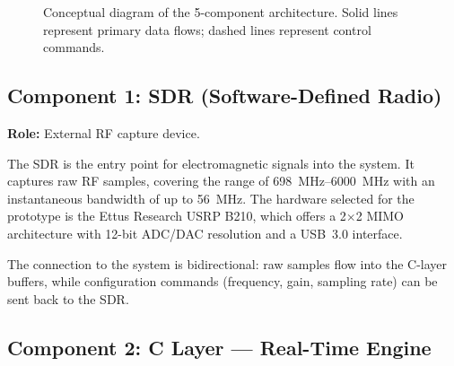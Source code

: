 \documentclass[12pt,a4paper]{article}
\begin{document}
\begin{figure}[H]
\caption{Conceptual diagram of the 5-component architecture. Solid lines represent primary data flows; dashed lines represent control commands.}
\label{fig:arch}
\end{figure}

\subsection{Component 1: SDR (Software-Defined Radio)}

\textbf{Role:} External RF capture device.

The SDR is the entry point for electromagnetic signals into the system. It captures raw RF samples, covering the range of \qtyrange{698}{6000}{\MHz} with an instantaneous bandwidth of up to \qty{56}{\MHz}. The hardware selected for the prototype is the Ettus Research USRP B210, which offers a 2$\times$2 MIMO architecture with 12-bit ADC/DAC resolution and a USB~3.0 interface.

The connection to the system is bidirectional: raw samples flow into the C-layer buffers, while configuration commands (frequency, gain, sampling rate) can be sent back to the SDR.

\subsection{Component 2: C Layer --- Real-Time Engine}
\end{document}
